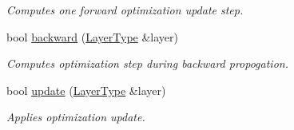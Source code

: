 \begin{DoxyCompactItemize}
\begin{DoxyCompactList}\small\item\em Computes one forward optimization update step. \end{DoxyCompactList}\item 
bool \hyperlink{classffnn_1_1optimizer_1_1_gradient_descent_3_01layer_1_1_convolution_3_01_t_a_r_g_s_01_4_01_4_a8b37b876d0d861623d36764a37e3e6e2}{backward} (\hyperlink{classffnn_1_1optimizer_1_1_gradient_descent_3_01layer_1_1_convolution_3_01_t_a_r_g_s_01_4_01_4_a4b4e11ad265dd0fba9010b60d6cea09b}{Layer\-Type} \&layer)
\begin{DoxyCompactList}\small\item\em Computes optimization step during backward propogation. \end{DoxyCompactList}\item 
bool \hyperlink{classffnn_1_1optimizer_1_1_gradient_descent_3_01layer_1_1_convolution_3_01_t_a_r_g_s_01_4_01_4_a3cbbcd9490ff52ee7984bfcb17db4ee1}{update} (\hyperlink{classffnn_1_1optimizer_1_1_gradient_descent_3_01layer_1_1_convolution_3_01_t_a_r_g_s_01_4_01_4_a4b4e11ad265dd0fba9010b60d6cea09b}{Layer\-Type} \&layer)
\begin{DoxyCompactList}\small\item\em Applies optimization update. \end{DoxyCompactList}\end{DoxyCompactItemize}
